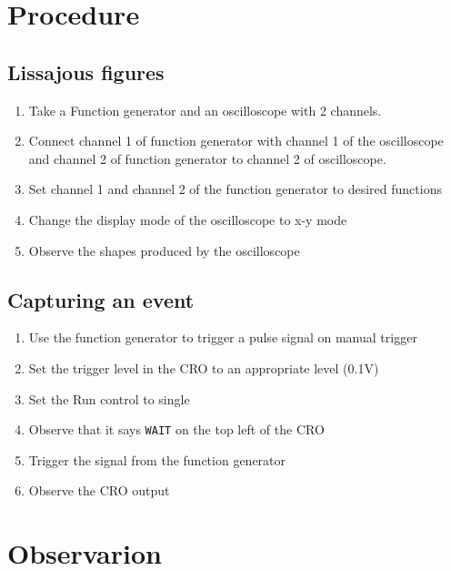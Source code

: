\documentclass[journal]{IEEEtran}
\begin{document}


\section{Procedure}
\subsection{Lissajous figures}
\begin{enumerate}
    \item Take a Function generator and an oscilloscope with 2 channels.
    \item Connect channel 1 of function generator with channel 1 of the oscilloscope and channel 2 of function generator to channel 2 of oscilloscope.
    \item Set channel 1 and channel 2 of the function generator to desired functions
    \item Change the display mode of the oscilloscope to x-y mode
    \item Observe the shapes produced by the oscilloscope
\end{enumerate}

\subsection{Capturing an event}
\begin{enumerate}
    \item Use the function generator to trigger a pulse signal on manual trigger
    \item Set the trigger level in the CRO to an appropriate level (0.1V)
    \item Set the Run control to single
    \item Observe that it says \texttt{WAIT} on the top left of the CRO
    \item Trigger the signal from the function generator
    \item Observe the CRO output
\end{enumerate}

\section{Observarion}
\end{document}

